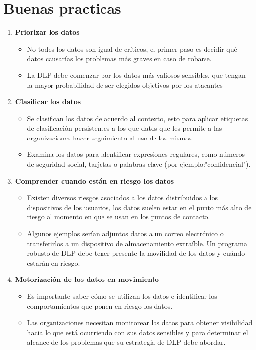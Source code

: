 \documentclass{article}
\begin{document}
	\section{Buenas practicas}
	\begin{enumerate}
		\item \textbf{Priorizar los datos}
		\begin{itemize}
			\item No todos los datos son igual de críticos, el primer paso es decidir qué datos causarías los problemas más graves en caso de robarse. 
			\item La DLP debe comenzar por los datos más valiosos sensibles, que tengan la mayor probabilidad de ser elegidos objetivos por los atacantes
		\end{itemize}
		\item \textbf{Clasificar los datos}
		\begin{itemize}
			\item Se clasifican los datos de acuerdo al contexto, esto para aplicar etiquetas de clasificación persistentes a los que datos que les permite a las organizaciones hacer seguimiento al uso de los mismos.
			\item Examina los datos para identificar expresiones regulares, como números de seguridad social, tarjetas o palabras clave (por ejemplo:"confidencial").
		\end{itemize}
		\item \textbf{Comprender cuando están en riesgo los datos}
		\begin{itemize}
			\item Existen diversos riesgos asociados a los datos distribuidos a los dispositivos de los usuarios, los datos suelen estar en el punto más alto de riesgo al momento en que se usan en los puntos de contacto. 
			\item Algunos ejemplos serían adjuntos datos a un correo electrónico o transferirlos a un dispositivo de almacenamiento extraíble. Un programa robusto de DLP debe tener presente la movilidad de los datos y cuándo estarán en riesgo.
		\end{itemize}
		\item \textbf{Motorización de los datos en movimiento}
		\begin{itemize}
			\item Es importante saber cómo se utilizan los datos e identificar los comportamientos que ponen en riesgo los datos.
			\item Las organizaciones necesitan monitorear los datos para obtener visibilidad hacia lo que está ocurriendo con sus datos sensibles y para determinar el alcance de los problemas que su estrategia de DLP debe abordar.
		\end{itemize}
	\end{enumerate}
	
\end{document}
